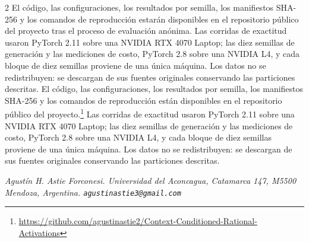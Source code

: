 \begin{multicols}{2}
\ifanonima
El código, las configuraciones, los resultados por semilla, los manifiestos SHA-256 y los comandos de reproducción estarán disponibles en el repositorio público del proyecto tras el proceso de evaluación anónima. Las corridas de exactitud usaron PyTorch 2.11 sobre una NVIDIA RTX 4070 Laptop; las diez semillas de generación y las mediciones de costo, PyTorch 2.8 sobre una NVIDIA L4, y cada bloque de diez semillas proviene de una única máquina. Los datos no se redistribuyen: se descargan de sus fuentes originales conservando las particiones descritas.
\else
El código, las configuraciones, los resultados por semilla, los manifiestos SHA-256 y los comandos de reproducción están disponibles en el repositorio público del proyecto.\footnote{\url{https://github.com/agustinastie2/Context-Conditioned-Rational-Activations}} Las corridas de exactitud usaron PyTorch 2.11 sobre una NVIDIA RTX 4070 Laptop; las diez semillas de generación y las mediciones de costo, PyTorch 2.8 sobre una NVIDIA L4, y cada bloque de diez semillas proviene de una única máquina. Los datos no se redistribuyen: se descargan de sus fuentes originales conservando las particiones descritas.
\fi

\renewcommand\refname{Referencias}



\ifanonima\else
{}

{\footnotesize\raggedright
\textit{Agustín H. Astie Forconesi. Universidad del Aconcagua, Catamarca 147, M5500 Mendoza, Argentina. \texttt{agustinastie3@gmail.com}}\par}
\fi

\end{multicols}


